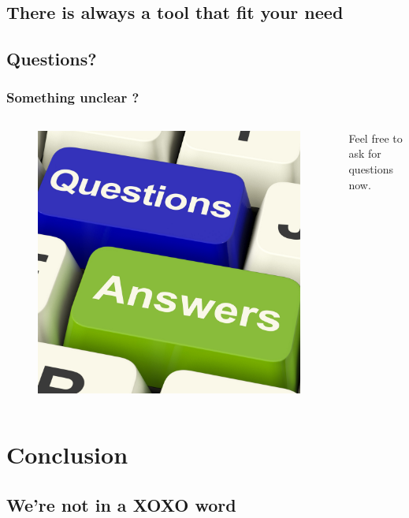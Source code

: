 \documentclass{beamer}
\begin{document}
\subsection{There is always a tool that fit your need}
\begin{frame}
\end{frame}

\subsection{Questions?}
\begin{frame}
\frametitle{Something unclear ?}
\begin{columns}[c]
\begin{figure}
\includegraphics[width=0.8\linewidth]{./materials/questions}
\end{figure}
Feel free to ask for questions now.
\end{columns}
\end{frame}

\section{Conclusion}
\subsection{We're not in a XOXO word}
\begin{frame}
\end{frame}
\end{document}
